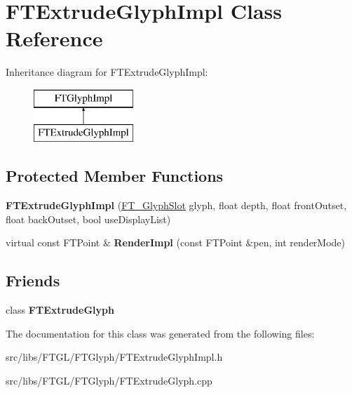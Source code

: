 \hypertarget{class_f_t_extrude_glyph_impl}{
\section{FTExtrudeGlyphImpl Class Reference}
\label{class_f_t_extrude_glyph_impl}
}
Inheritance diagram for FTExtrudeGlyphImpl:\begin{figure}[H]
\begin{center}
\leavevmode
\includegraphics[height=2.000000cm]{class_f_t_extrude_glyph_impl}
\end{center}
\end{figure}
\subsection*{Protected Member Functions}
\begin{DoxyCompactItemize}
\item 
\hypertarget{class_f_t_extrude_glyph_impl_adbfa8d05122539318f6caa8b77a5c291}{
{\bfseries FTExtrudeGlyphImpl} (\hyperlink{struct_f_t___glyph_slot_rec__}{FT\_\-GlyphSlot} glyph, float depth, float frontOutset, float backOutset, bool useDisplayList)}
\label{class_f_t_extrude_glyph_impl_adbfa8d05122539318f6caa8b77a5c291}

\item 
\hypertarget{class_f_t_extrude_glyph_impl_a7ba3363d6764a14a6954f068f626029b}{
virtual const FTPoint \& {\bfseries RenderImpl} (const FTPoint \&pen, int renderMode)}
\label{class_f_t_extrude_glyph_impl_a7ba3363d6764a14a6954f068f626029b}

\end{DoxyCompactItemize}
\subsection*{Friends}
\begin{DoxyCompactItemize}
\item 
\hypertarget{class_f_t_extrude_glyph_impl_a43bdcab05c1db93d9474fee8176c1fb0}{
class {\bfseries FTExtrudeGlyph}}
\label{class_f_t_extrude_glyph_impl_a43bdcab05c1db93d9474fee8176c1fb0}

\end{DoxyCompactItemize}


The documentation for this class was generated from the following files:\begin{DoxyCompactItemize}
\item 
src/libs/FTGL/FTGlyph/FTExtrudeGlyphImpl.h\item 
src/libs/FTGL/FTGlyph/FTExtrudeGlyph.cpp\end{DoxyCompactItemize}
